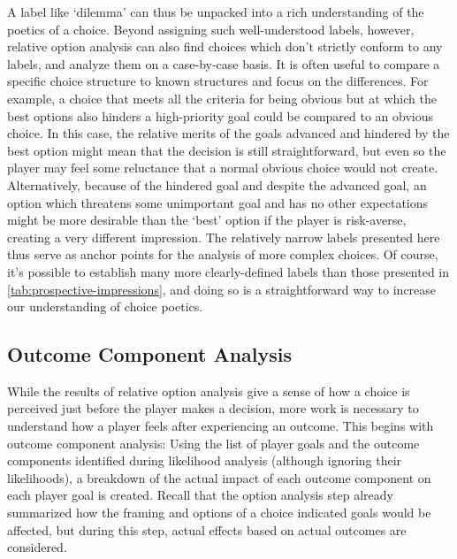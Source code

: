 A label like `dilemma' can thus be unpacked into a rich understanding of the poetics of a choice.
%
Beyond assigning such well-understood labels, however, relative option analysis can also find choices which don't strictly conform to any labels, and analyze them on a case-by-case basis.
%
It is often useful to compare a specific choice structure to known structures and focus on the differences.
%
For example, a choice that meets all the criteria for being obvious but at which the best options also hinders a high-priority goal could be compared to an obvious choice.
%
In this case, the relative merits of the goals advanced and hindered by the best option might mean that the decision is still straightforward, but even so the player may feel some reluctance that a normal obvious choice would not create.
%
Alternatively, because of the hindered goal and despite the advanced goal, an option which threatens some unimportant goal and has no other expectations might be more desirable than the `best' option if the player is risk-averse, creating a very different impression.
%
The relatively narrow labels presented here thus serve as anchor points for the analysis of more complex choices.
%
Of course, it's possible to establish many more clearly-defined labels than those presented in \cref{tab:prospective-impressions}, and doing so is a straightforward way to increase our understanding of choice poetics.


\subsection{Outcome Component Analysis}

\label{sec:cp-outcome-component-analysis}

While the results of relative option analysis give a sense of how a choice is perceived just before the player makes a decision, more work is necessary to understand how a player feels after experiencing an outcome.
%
This begins with outcome component analysis: Using the list of player goals and the outcome components identified during likelihood analysis (although ignoring their likelihoods), a breakdown of the actual impact of each outcome component on each player goal is created.
%
Recall that the option analysis step already summarized how the framing and options of a choice indicated goals would be affected, but during this step, actual effects based on actual outcomes are considered.


